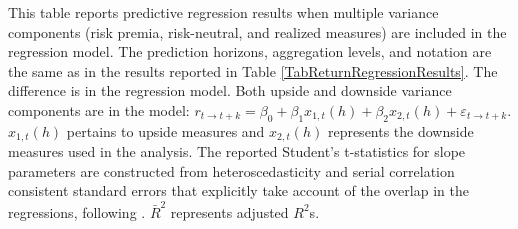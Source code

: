 \documentclass[11pt]{article}
\begin{document}
\begin{table}
  \noindent\scriptsize This table reports predictive regression results when multiple variance components (risk premia, risk-neutral, and realized measures) are included in the regression model. The prediction horizons, aggregation levels, and notation are the same as in the results reported in Table \ref{TabReturnRegressionResults}. The difference is in the regression model. Both upside and downside variance components are in the model: $r_{t\rightarrow t+k} = \beta_0 + \beta_1 x_{1,t}(h) + \beta_2 x_{2,t}(h) + \varepsilon_{t\rightarrow t+k}$. $x_{1,t}(h)$ pertains to upside measures and $x_{2,t}(h)$ represents the downside measures used in the analysis. The reported Student's t-statistics for slope parameters are constructed from heteroscedasticity and serial correlation consistent standard errors that explicitly take account of the overlap in the regressions, following \cite{Hodrick92RFS}. $\bar{R}^2$ represents adjusted $R^2$s.
\end{table}




\clearpage
\newpage
\end{document}
